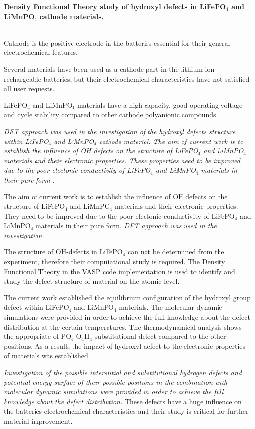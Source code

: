 \textbf{Density Functional Theory study of hydroxyl defects in LiFePO$_4$ and LiMnPO$_4$ cathode materials. }


\\
Cathode is the positive electrode in the batteries essential for their general electrochemical features.

Several materials have been used as a cathode part in the lithium-ion rechargeable batteries, but their electrochemical characteristics have not satisfied all user requests. 

LiFePO$_4$ and LiMnPO$_4$ materials have a high capacity, good operating voltage and cycle stability compared to other cathode polyanionic compounds.

\textit{DFT approach was used in the investigation of the hydroxyl defects structure within LiFePO$_4$ and LiMnPO$_4$ cathode material. The aim of current work is to establish the influence of OH defects on the structure of LiFePO$_4$ and LiMnPO$_4$ materials and their electronic properties. These properties need to be improved due to the poor electonic conductivity of LiFePO$_4$ and LiMnPO$_4$ materials in their pure form .}

The aim of current work is to establish the influence of OH defects on the structure of LiFePO$_4$ and LiMnPO$_4$ materials and their electronic properties. They need to be improved due to the poor electonic conductivity of LiFePO$_4$ and LiMnPO$_4$ materials in their pure form. \textit{DFT approach was used in the investigation. }

The structure of OH-defects in LiFePO$_4$ can not be determined from the experiment, therefore their computational study is required. The Density Functional Theory in the VASP code implementation is used to identify and study the defect structure of material on the atomic level. 

The current work established the equilibrium configuration of the hydroxyl group defect within LiFePO$_4$ and LiMnPO$_4$ materials. The molecular dynamic simulations were provided in order to achieve the full knowledge about the defect distribution at the certain temperatures. The thermodynamical analysis shows the appropriate of PO$_4$-O$_4$H$_4$ substitutional defect compared to the other positions. As a result, the impact of hydroxyl defect to the electronic properties of materials was established.

\textit{Investigation of the possible interstitial and substitutional hydrogen defects and potential energy surface of their possible positions in the combination with molecular dynamic simulations were provided in order to achieve the full knowledge about the defect distribution.} These defects have a huge influence on the batteries electrochemical characteristics and their study is critical for further material improvement. 


